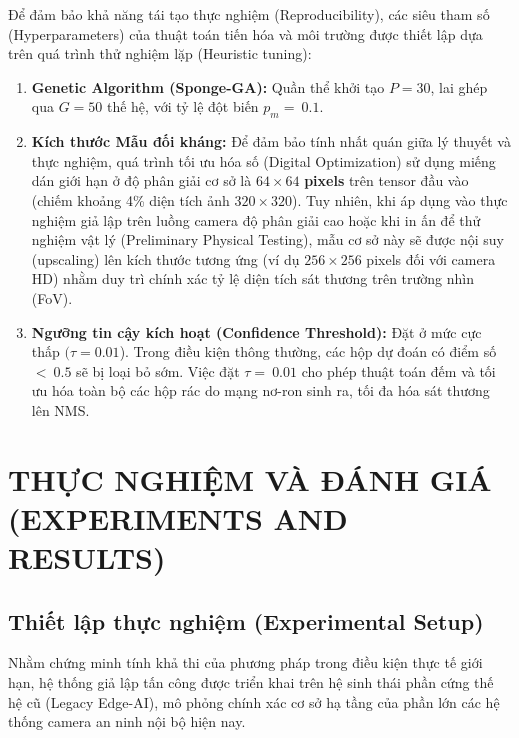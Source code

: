 \documentclass[a4paper,fleqn]{cas-dc}
\begin{document}
Để đảm bảo khả năng tái tạo thực nghiệm (Reproducibility), các siêu tham
số (Hyperparameters) của thuật toán tiến hóa và môi trường được thiết
lập dựa trên quá trình thử nghiệm lặp (Heuristic tuning):

\begin{enumerate}
\def\labelenumi{\arabic{enumi}.}
\item
  \textbf{Genetic Algorithm (Sponge-GA):} Quần thể khởi tạo \(P = 30\),
  lai ghép qua \(G = 50\) thế hệ, với tỷ lệ đột biến \(p_{m} = \ 0.1\).
\item
  \textbf{Kích thước Mẫu đối kháng:} Để đảm bảo tính nhất quán giữa lý
  thuyết và thực nghiệm, quá trình tối ưu hóa số (Digital Optimization)
  sử dụng miếng dán giới hạn ở độ phân giải cơ sở là \(64 \times 64\)
  \textbf{pixels} trên tensor đầu vào (chiếm khoảng 4\% diện tích ảnh
  \(320 \times 320\)). Tuy nhiên, khi áp dụng vào thực nghiệm giả lập
  trên luồng camera độ phân giải cao hoặc khi in ấn để thử nghiệm vật lý
  (Preliminary Physical Testing), mẫu cơ sở này sẽ được nội suy
  (upscaling) lên kích thước tương ứng (ví dụ \(256 \times 256\) pixels
  đối với camera HD) nhằm duy trì chính xác tỷ lệ diện tích sát thương
  trên trường nhìn (FoV).
\item
  \textbf{Ngưỡng tin cậy kích hoạt (Confidence Threshold):} Đặt ở mức
  cực thấp \((\tau = 0.01\)). Trong điều kiện thông thường, các hộp dự
  đoán có điểm số \(< \ 0.5\) sẽ bị loại bỏ sớm. Việc đặt
  \(\tau = \ 0.01\) cho phép thuật toán đếm và tối ưu hóa toàn bộ các
  hộp rác do mạng nơ-ron sinh ra, tối đa hóa sát thương lên NMS.
\end{enumerate}

\section{THỰC NGHIỆM VÀ ĐÁNH GIÁ (EXPERIMENTS AND RESULTS)}



\subsection{Thiết lập thực nghiệm (Experimental Setup)}



Nhằm chứng minh tính khả thi của phương pháp trong điều kiện thực tế
giới hạn, hệ thống giả lập tấn công được triển khai trên hệ sinh thái
phần cứng thế hệ cũ (Legacy Edge-AI), mô phỏng chính xác cơ sở hạ tầng
của phần lớn các hệ thống camera an ninh nội bộ hiện nay.
\end{document}
